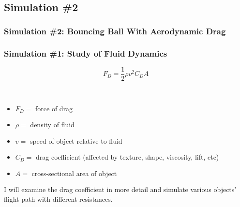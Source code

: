 \documentclass{beamer}
\begin{document}
\subsection{Simulation \#2}

\begin{frame}
\frametitle{Simulation \#2: Bouncing Ball With Aerodynamic Drag}

\end{frame}

















































\begin{frame}

\frametitle{Simulation \#1:  Study of Fluid Dynamics}

$$ F_D = \frac{1}{2} \rho  v^2 C_D A$$

 \
 \begin{itemize}
 \item  $ F_D =   $ force of drag
\item $\rho = $ density of fluid
\item $v = $ speed of object relative to fluid
\item  $C_D = $ drag coefficient (affected by texture, shape, viscosity, lift, etc)  
\item $ A = $ cross-sectional area of object
\end{itemize}

I will examine the drag coefficient in more detail and simulate various objects' flight path with different resistances.  


\end{frame}
\end{document}
